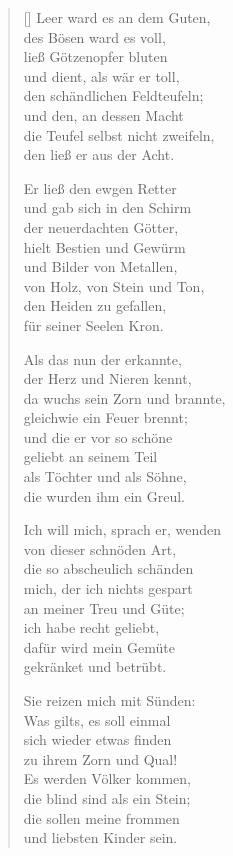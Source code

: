 \begin{multicols}{2}
\begin{verse}[\versewidth]
 Leer ward es an dem Guten,\\
des Bösen ward es voll,\\
ließ Götzenopfer bluten\\
und dient, als wär er toll,\\
den schändlichen Feldteufeln;\\
und den, an dessen Macht\\
die Teufel selbst nicht zweifeln,\\
den ließ er aus der Acht.

 Er ließ den ewgen Retter\\
und gab sich in den Schirm\\
der neuerdachten Götter,\\
hielt Bestien und Gewürm\\
und Bilder von Metallen,\\
von Holz, von Stein und Ton,\\
den Heiden zu gefallen,\\
für seiner Seelen Kron.

 Als das nun der erkannte,\\
der Herz und Nieren kennt,\\
da wuchs sein Zorn und brannte,\\
gleichwie ein Feuer brennt;\\
und die er vor so schöne\\
geliebt an seinem Teil\\
als Töchter und als Söhne,\\
die wurden ihm ein Greul.

 Ich will mich, sprach er, wenden\\
von dieser schnöden Art,\\
die so abscheulich schänden\\
mich, der ich nichts gespart\\
an meiner Treu und Güte;\\
ich habe recht geliebt,\\
dafür wird mein Gemüte\\
gekränket und betrübt.

 Sie reizen mich mit Sünden:\\
Was gilts, es soll einmal\\
sich wieder etwas finden\\
zu ihrem Zorn und Qual!\\
Es werden Völker kommen,\\
die blind sind als ein Stein;\\
die sollen meine frommen\\
und liebsten Kinder sein.


\end{verse}
\end{multicols}
